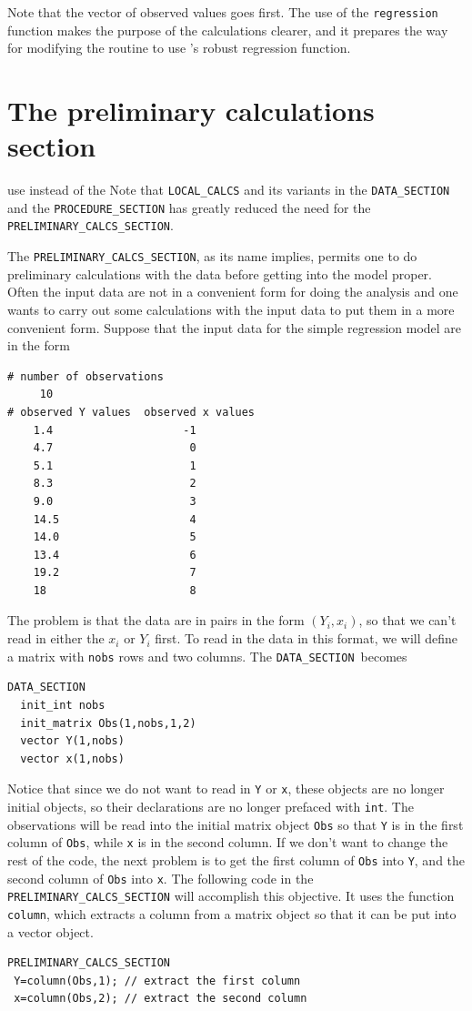\documentclass{admbmanual}
\newcommand\DS{\texttt{DATA\_SECTION}}
\begin{document}
Note that the vector of observed values goes first. The use of the
\texttt{regression} function makes the purpose of the calculations clearer, and
it prepares the way for modifying the routine to use \ADM's robust regression
function.

\section{The preliminary calculations section}

%
{use instead of the }
Note that \texttt{LOCAL\_CALCS} and its variants in the \texttt{DATA\_SECTION}
and the \texttt{PROCEDURE\_SECTION} has greatly reduced the need for the
\texttt{PRELIMINARY\_CALCS\_SECTION}.

The \texttt{PRELIMINARY\_CALCS\_SECTION}, as its name implies, permits one to do
preliminary calculations with the data before getting into the model proper.
Often the input data are not in a convenient form for doing the analysis and one
wants to carry out some calculations with the input data to put them in a more
convenient form. Suppose that the input data for the simple regression model are
in the form
\begin{lstlisting}
# number of observations
     10
# observed Y values  observed x values
    1.4                    -1
    4.7                     0
    5.1                     1
    8.3                     2
    9.0                     3
    14.5                    4
    14.0                    5
    13.4                    6
    19.2                    7
    18                      8
\end{lstlisting}
The problem is that the data are in pairs in the form $(Y_i,x_i)$, so that we
can't read in either the $x_i$ or $Y_i$ first. To read in the data in this
format, we will define a matrix with \texttt{nobs} rows and two columns. The
\DS\ becomes
\begin{lstlisting}
DATA_SECTION
  init_int nobs
  init_matrix Obs(1,nobs,1,2)
  vector Y(1,nobs)
  vector x(1,nobs)
\end{lstlisting}
Notice that since we do not want to read in \texttt{Y} or \texttt{x}, these
objects are no longer initial objects, so their declarations are no longer
prefaced with \texttt{int}. The observations will be read into the initial
matrix object \texttt{Obs} so that \texttt{Y} is in the first column of
\texttt{Obs}, while \texttt{x} is in the second column. If we don't want to
change the rest of the code, the next problem is to get the first column of
\texttt{Obs} into \texttt{Y}, and the second column of \texttt{Obs} into
\texttt{x}. The following code in the \texttt{PRELIMINARY\_CALCS\_SECTION} will
accomplish this objective. It uses the function \texttt{column}, which extracts
a column from a matrix object so that it can be put into a vector object.
\begin{lstlisting}
PRELIMINARY_CALCS_SECTION
 Y=column(Obs,1); // extract the first column
 x=column(Obs,2); // extract the second column
\end{lstlisting}
\end{document}
